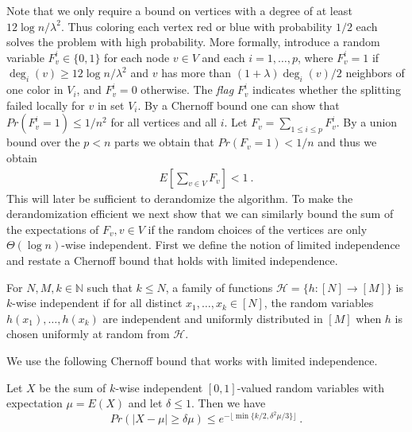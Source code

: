 Note that we only require a bound on vertices with a degree of at least $12\log n/\lambda^2$. Thus coloring each vertex red or blue with probability $1/2$ each solves the problem with high probability. More formally, introduce a random variable $F^i_v\in \{0,1\}$ for each node $v\in V$ and each $i=1,\ldots,p$, where $F^i_v=1$ if $\deg_i(v)\geq 12\log n/\lambda^2$ and  $v$  has more than $(1+\lambda) \deg_i(v)/2$ neighbors of one color in $V_i$, and $F^i_v=0$ otherwise. The \emph{flag} $F^i_v$ indicates whether the splitting failed locally for $v$ in set $V_i$. 
By a Chernoff  bound one can show that  $Pr(F^i_v=1)\leq 1/n^2$ for all vertices and all $i$. Let $F_v=\sum_{1\leq i\leq p}F^i_v$. By a union bound over the $p< n$ parts we obtain that $Pr(F_v=1)<1/n$  and thus we obtain 
\begin{align}
E[\sum_{v\in V}F_v]<1~.
\end{align}
This will later be sufficient to derandomize the algorithm. To make the derandomization efficient
 we next show that we can similarly bound the sum of the expectations of $F_v, v\in V$ if the random choices of the vertices are only $\Theta(\log n)$-wise independent. First we define the notion of limited independence and restate a Chernoff bound that holds with limited independence. 

\begin{definition}
For $N,M,k\in\mathbb{N}$ such that $k\leq N$, a family of functions $\mathcal{H}=\{h:[N]\to [M]\}$ is $k$-wise independent if for all distinct $x_1,\dots,x_k\in[N]$, the random variables $h(x_1),\dots,h(x_k)$ are independent and uniformly distributed in $[M]$ when $h$ is chosen uniformly at random from $\mathcal{H}$.
\end{definition}
We use the following Chernoff bound that works with limited independence.
\begin{theorem} \label{thm:kindependent}
Let $X$ be the sum of $k$-wise independent $[0,1]$-valued random variables with expectation $\mu=E(X)$ and let $\delta\leq 1$. Then we have
\[Pr(|X-\mu|\geq \delta\mu)\leq e^{-\lfloor \min\{k/2,\delta^2\mu/3\}\rfloor}~.\] 
\end{theorem}

